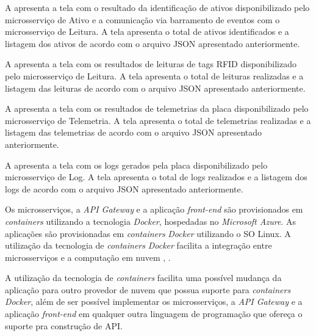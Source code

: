 A  apresenta a tela com o resultado da identificação de ativos disponibilizado pelo microsserviço de Ativo e a comunicação via barramento de eventos com o microsserviço de Leitura. A tela apresenta o total de ativos identificados e a listagem dos ativos de acordo com o arquivo \acrshort{JSON} apresentado anteriormente.

A  apresenta a tela com os resultados de leituras de tags \acrshort{RFID} disponibilizado pelo microsserviço de Leitura. A tela apresenta o total de leituras realizadas e a listagem das leituras de acordo com o arquivo \acrshort{JSON} apresentado anteriormente.

A  apresenta a tela com os resultados de telemetrias da placa disponibilizado pelo microsserviço de Telemetria. A tela apresenta o total de telemetrias realizadas e a listagem das telemetrias de acordo com o arquivo \acrshort{JSON} apresentado anteriormente.

A  apresenta a tela com os logs gerados pela placa disponibilizado pelo microsserviço de Log. A tela apresenta o total de logs realizados e a listagem dos logs de acordo com o arquivo \acrshort{JSON} apresentado anteriormente.





\newpage

Os microsserviços, a \textit{API Gateway} e a aplicação \textit{front-end} são provisionados em \textit{containers} utilizando a tecnologia \textit{Docker}, hospedadas no \textit{Microsoft Azure}. As aplicações são provisionadas em \textit{containers} \textit{Docker} utilizando o \acrshort{SO} Linux. A utilização da tecnologia de \textit{containers} \textit{Docker} facilita a integração entre microsserviços e a computação em nuvem \cite{Vandikas2017}, \cite{Khazaei2017End-to-endApplications}.

A utilização da tecnologia de \textit{containers} facilita uma possível mudança da aplicação para outro provedor de nuvem que possua suporte para \textit{containers} \textit{Docker}, além de ser possível implementar os microsserviços, a \textit{API Gateway} e a aplicação \textit{front-end} em qualquer outra linguagem de programação que ofereça o suporte pra construção de \acrshort{API}.

